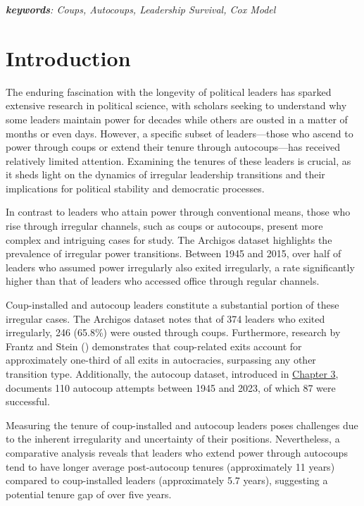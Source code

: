 \documentclass[
  12pt,
]{report}
\begin{document}
\emph{\textbf{keywords}: Coups, Autocoups, Leadership Survival, Cox
Model}

\newpage

\section{Introduction}\label{introduction-3}

The enduring fascination with the longevity of political leaders has
sparked extensive research in political science, with scholars seeking
to understand why some leaders maintain power for decades while others
are ousted in a matter of months or even days. However, a specific
subset of leaders---those who ascend to power through coups or extend
their tenure through autocoups---has received relatively limited
attention. Examining the tenures of these leaders is crucial, as it
sheds light on the dynamics of irregular leadership transitions and
their implications for political stability and democratic processes.

In contrast to leaders who attain power through conventional means,
those who rise through irregular channels, such as coups or autocoups,
present more complex and intriguing cases for study. The Archigos
dataset highlights the prevalence of irregular power transitions.
Between 1945 and 2015, over half of leaders who assumed power
irregularly also exited irregularly, a rate significantly higher than
that of leaders who accessed office through regular channels.

Coup-installed and autocoup leaders constitute a substantial portion of
these irregular cases. The Archigos dataset notes that of 374 leaders
who exited irregularly, 246 (65.8\%) were ousted through coups.
Furthermore, research by Frantz and Stein
() demonstrates that coup-related exits
account for approximately one-third of all exits in autocracies,
surpassing any other transition type. Additionally, the autocoup
dataset, introduced in \hyperref[sec-chapter3]{Chapter 3}, documents 110
autocoup attempts between 1945 and 2023, of which 87 were successful.

Measuring the tenure of coup-installed and autocoup leaders poses
challenges due to the inherent irregularity and uncertainty of their
positions. Nevertheless, a comparative analysis reveals that leaders who
extend power through autocoups tend to have longer average post-autocoup
tenures (approximately 11 years) compared to coup-installed leaders
(approximately 5.7 years), suggesting a potential tenure gap of over
five years.
\end{document}
